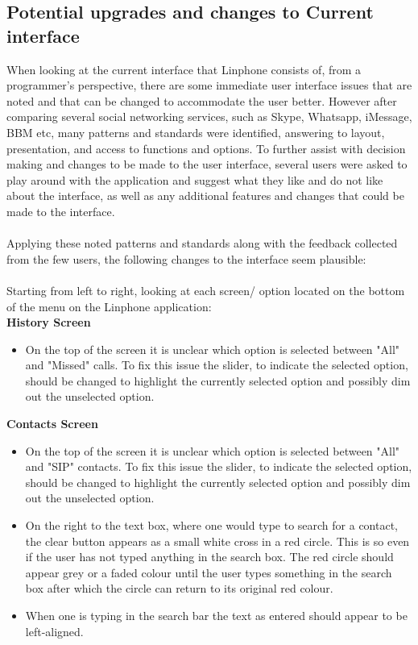 \documentclass[11pt]{article}
\begin{document}
\subsection{Potential upgrades and changes to Current interface}
When looking at the current interface that Linphone consists of, from a programmer’s perspective, there are some immediate user interface issues that are noted and that can be changed to accommodate the user better. However after comparing several social networking services, such as Skype, Whatsapp, iMessage, BBM etc, many patterns and standards were identified, answering to layout, presentation, and access to functions and options. To further assist with decision making and changes to be made to the user interface, several users were asked to play around with the application and suggest what they like and do not like about the interface, as well as any additional features and changes that could be made to the interface.\\\\
Applying these noted patterns and standards along with the feedback collected from the few users, the following changes to the interface seem plausible: \\\\
Starting from left to right, looking at each screen/ option located on the bottom of the menu on the Linphone application:
\\ 
\textbf{History Screen}
\begin{itemize}
\item On the top of the screen it is unclear which option is selected between "All" and "Missed" calls. To fix this issue the slider, to indicate the selected option, should be changed to highlight the currently selected option and possibly dim out the unselected option.
\end{itemize}

\textbf{Contacts Screen}
\begin{itemize}
\item On the top of the screen it is unclear which option is selected between "All" and "SIP" contacts. To fix this issue the slider, to indicate the selected option, should be changed to highlight the currently selected option and possibly dim out the unselected option.

\item On the right to the text box, where one would type to search for a contact, the clear button appears as a small white cross in a red circle. This is so even if the user has not typed anything in the search box. The red circle should appear grey or a faded colour until the user types something in the search box after which the circle can return to its original red colour. 

\item When one is typing in the search bar the text as entered should appear to be left-aligned.
\end{itemize}
\end{document}
